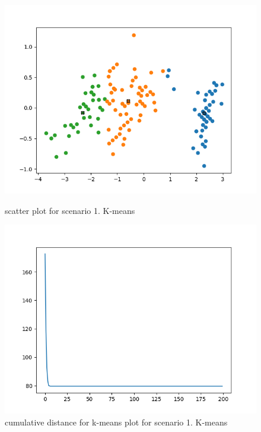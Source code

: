 \documentclass[a4paper]{article}
\begin{document}
\begin{figure}[h!]
            \begin{minipage}[t]{6.5cm}
              \includegraphics[width=1.0\textwidth]{pca_k_1_1.png}
              \caption{scatter plot for scenario 1. K-means}
            \end{minipage}
            \hspace{2cm}
            \begin{minipage}[t]{6.5cm}
              \includegraphics[width=1.0\textwidth]{pca_k_1_2.png}
              \caption{cumulative distance for k-means plot for scenario 1. K-means}
            \end{minipage}
          \end{figure}
\end{document}
